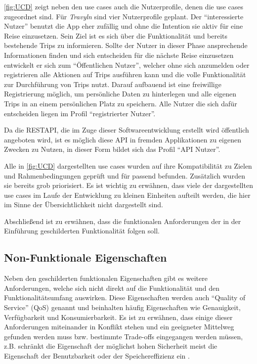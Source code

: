 \vspace{0.25cm}

\autoref{fig:UCD} zeigt neben den use cases auch die Nutzerprofile, denen die use cases zugeordnet sind. Für \textit{Travyln} sind vier Nutzerprofile geplant. Der \enquote{interessierte Nutzer} benutzt die App eher zufällig und ohne die Intention sie aktiv für eine Reise einzusetzen. Sein Ziel ist es sich über die Funktionalität und bereits bestehende Trips zu informieren. Sollte der Nutzer in dieser Phase ansprechende Informationen finden und sich entscheiden  für die nächste Reise einzusetzen entwickelt er sich zum \enquote{Öffentlichen Nutzer}, welcher ohne sich anzumelden oder registrieren alle Aktionen auf Trips ausführen kann und die volle Funktionalität zur Durchführung von Trips nutzt. Darauf aufbauend ist eine freiwillige Registrierung möglich, um persönliche Daten zu hinterlegen und alle eigenen Trips in an einem persönlichen Platz zu speichern. Alle Nutzer die sich dafür entscheiden liegen im Profil \enquote{registrierter Nutzer}.

\vspace{0.25cm}

Da die RESTAPI, die im Zuge dieser Softwareentwicklung erstellt wird öffentlich angeboten wird, ist es möglich diese API in fremden Applikationen zu eigenen Zwecken zu Nutzen, in dieser Form bildet sich das Profil \enquote{API Nutzer}.

\vspace{0.25cm}

 
Alle in \autoref{fig:UCD} dargestellten use cases wurden auf ihre Kompatibilität zu Zielen und Rahmenbedingungen geprüft und für passend befunden. Zusätzlich wurden sie bereits grob priorisiert. Es ist wichtig zu erwähnen, dass viele der dargestellten use cases im Laufe der Entwicklung zu kleinen Einheiten aufteilt werden, die hier im Sinne der Übersichtlichkeit nicht dargestellt sind.



Abschließend ist zu erwähnen, dass die funktionalen Anforderungen der in der Einführung geschilderten Funktionalität folgen soll.

\subsection{Non-Funktionale Eigenschaften}
Neben den geschilderten funktionalen Eigenschaften gibt es weitere Anforderungen, welche sich nicht direkt auf die Funktionalität und den Funktionalitätsumfang auswirken. Diese Eigenschaften werden auch \enquote{Quality of Service} (QoS) genannt und beinhalten häufig Eigenschaften wie  Genauigkeit, Verfügbarkeit und  Konsumierbarkeit. Es ist zu erwähnen, dass einige dieser Anforderungen miteinander in Konflikt stehen und ein geeigneter Mittelweg gefunden werden muss bzw. bestimmte Trade-offs eingegangen werden müssen, z.B. schränkt die Eigenschaft der möglichst hohen Sicherheit meist die Eigenschaft der Benutzbarkeit oder der Speichereffizienz ein \cite{Balzert.2009}.  

